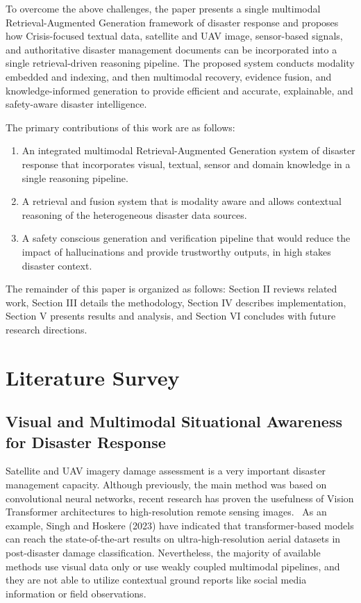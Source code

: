 \documentclass[conference]{IEEEtran}
\begin{document}
To overcome the above challenges, the paper presents a single multimodal Retrieval-Augmented Generation framework of disaster response and proposes how Crisis-focused textual data, satellite and UAV image, sensor-based signals, and authoritative disaster management documents can be incorporated into a single retrieval-driven reasoning pipeline. The proposed system conducts modality embedded and indexing, and then multimodal recovery, evidence fusion, and knowledge-informed generation to provide efficient and accurate, explainable, and safety-aware disaster intelligence.

The primary contributions of this work are as follows:

\begin{enumerate}
    \item An integrated multimodal Retrieval-Augmented Generation system of disaster response that incorporates visual, textual, sensor and domain knowledge in a single reasoning pipeline.
    
    \item A retrieval and fusion system that is modality aware and allows contextual reasoning of the heterogeneous disaster data sources.
    
    \item A safety conscious generation and verification pipeline that would reduce the impact of hallucinations and provide trustworthy outputs, in high stakes disaster context.
\end{enumerate}



The remainder of this paper is organized as follows: Section II reviews related work, Section III details the methodology, Section IV describes implementation, Section V presents results and analysis, and Section VI concludes with future research directions.


\section{Literature Survey}

\subsection{Visual and Multimodal Situational Awareness for Disaster Response}
Satellite and UAV imagery damage assessment is a very important disaster management capacity. Although previously, the main method was based on convolutional neural networks, recent research has proven the usefulness of Vision Transformer architectures to high-resolution remote sensing images.~\cite{b15} As an example, Singh and Hoskere (2023) have indicated that transformer-based models can reach the state-of-the-art results on ultra-high-resolution aerial datasets in post-disaster damage classification. Nevertheless, the majority of available methods use visual data only or use weakly coupled multimodal pipelines, and they are not able to utilize contextual ground reports like social media information or field observations.
\end{document}
